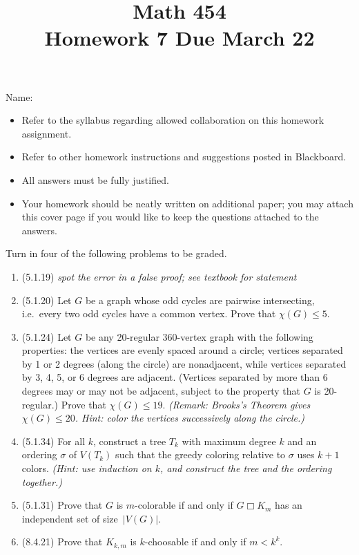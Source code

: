 \documentclass[11pt]{amsart}%
\newcommand{\cp}{\mathbin\Box}
\begin{document}
\title{Math 454\\ Homework 7 %
\qquad Due March 22%
}
\author{}
\date{}
\maketitle
\thispagestyle{empty}

\noindent Name:~\hrulefill~~\\

\begin{itemize}
\item Refer to the syllabus regarding allowed collaboration on this homework assignment.
\item Refer to other homework instructions and suggestions posted in Blackboard.
\item All answers must be fully justified.
\item Your homework should be neatly written on additional paper; you may attach this cover page if you would like to keep the questions attached to the answers.
\end{itemize}

\bigskip
Turn in four of the following problems to be graded.
\bigskip

\begin{enumerate}
\item (5.1.19)  \emph{spot the error in a false proof; see textbook for statement}
\item (5.1.20)  Let $G$ be a graph whose odd cycles are pairwise intersecting, i.e.~every two odd cycles have a common vertex.  Prove that $\chi(G)\leq5$.
\item (5.1.24)  Let $G$ be any 20-regular 360-vertex graph with the following properties: the vertices are evenly spaced around a circle; vertices separated by 1 or 2 degrees (along the circle) are nonadjacent, while vertices separated by 3, 4, 5, or 6 degrees are adjacent.  (Vertices separated by more than 6 degrees may or may not be adjacent, subject to the property that $G$ is 20-regular.)  Prove that $\chi(G)\leq19$.  \textit{(Remark: Brooks's Theorem gives $\chi(G)\leq20$.  Hint: color the vertices successively along the circle.)}
\item (5.1.34)  For all $k$, construct a tree $T_k$ with maximum degree $k$ and an ordering $\sigma$ of $V(T_k)$ such that the greedy coloring relative to $\sigma$ uses $k+1$ colors.  \textit{(Hint: use induction on $k$, and construct the tree and the ordering together.)}
\item (5.1.31)  Prove that $G$ is $m$-colorable if and only if $G\cp K_m$ has an independent set of size~$|V(G)|$.
\item (8.4.21) Prove that $K_{k,m}$ is $k$-choosable if and only if $m<k^k$.
\end{enumerate}
\end{document}
